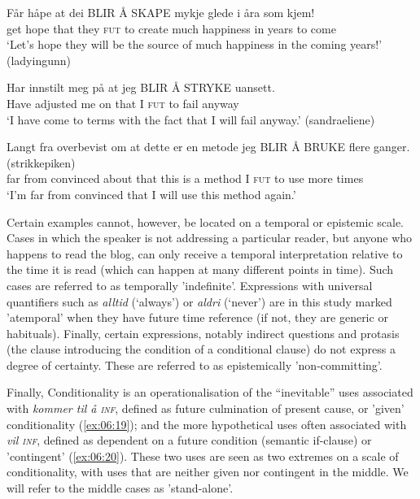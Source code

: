 \documentclass[output=paper,colorlinks,citecolor=brown]{langscibook}
\begin{document}
\ea\label{ex:06:16}
\gll Får håpe at dei BLIR Å SKAPE mykje glede i åra som kjem! \\
     get hope that they \textsc{fut} to create much happiness in years to come\\
\glt ‘Let’s hope they will be the source of much happiness in the coming years!’ (ladyingunn)
\z

\ea\label{ex:06:17}
\gll Har innstilt meg på at jeg BLIR Å STRYKE uansett. \\
     Have adjusted me on that I \textsc{fut} to fail anyway\\
\glt ‘I have come to terms with the fact that I will fail anyway.’ (sandraeliene)
\z

\ea\label{ex:06:18}
\gll Langt fra overbevist om at dette er en metode jeg BLIR Å BRUKE flere ganger. (strikkepiken)\\
     far from convinced about that this is a method I \textsc{fut} to use more times\\
\glt ‘I'm far from convinced that I will use this method again.’
\z

Certain examples cannot, however, be located on a temporal or epistemic scale. Cases in which the speaker is not addressing a particular reader, but anyone who happens to read the blog, can only receive a temporal interpretation relative to the time it is read (which can happen at many different points in time). Such cases are referred to as temporally 'indefinite'. Expressions with universal quantifiers such as \textit{alltid} (‘always’) or \textit{aldri} (‘never’) are in this study marked 'atemporal' when they have future time reference (if not, they are generic or habituals). Finally, certain expressions, notably indirect questions and protasis (the clause introducing the condition of a conditional clause) do not express a degree of certainty. These are referred to as epistemically 'non-committing'.

Finally, Conditionality is an operationalisation of the “inevitable” uses associated with \textit{kommer til å \textsc{inf}}, defined as future culmination of present cause, or 'given' conditionality (\ref{ex:06:19}); and the more hypothetical uses often associated with \textit{vil \textsc{inf}}, defined as dependent on a future condition (semantic if-clause) or 'contingent' (\ref{ex:06:20}). These two uses are seen as two extremes on a scale of conditionality, with uses that are neither given nor contingent in the middle. We will refer to the middle cases as 'stand-alone'.
\end{document}
